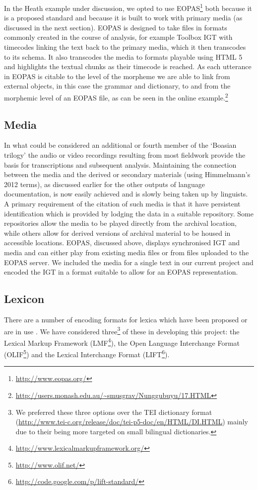 In the Heath example under discussion, we opted to use EOPAS\footnote{ \url{http://www.eopas.org/}} \citep{SchroeterEtAl2006} both because it is a proposed standard and because it is built to work with primary media (as discussed in the next section). EOPAS is designed to take files in formats commonly created in the course of analysis, for example Toolbox IGT with timecodes linking the text back to the primary media, which it then transcodes to its schema. It also transcodes the media to formats playable using HTML 5 and highlights the textual chunks as their timecode is reached. As each utterance in EOPAS is citable to the level of the morpheme we are able to link from external objects, in this case the grammar and dictionary, to and from the morphemic level of an EOPAS file, as can be seen in the online example.\footnote{\url{http://users.monash.edu.au/~smusgrav/Nunggubuyu/17.HTML}}

\subsection{Media}
In what could be considered an additional or fourth member of the `Boasian trilogy' the audio or video recordings resulting from most fieldwork provide the basis for transcriptions and subsequent analysis. Maintaining the connection between the media and the derived or secondary materials (using Himmelmann's 2012 terms), \nocite{Himmelmann2012} as discussed earlier for the other outputs of language documentation, is now easily achieved and is slowly being taken up by linguists. A primary requirement of the citation of such media is that it have persistent identification which is provided by lodging the data in a suitable repository. Some repositories allow the media to be played directly from the archival location, while others allow for derived versions of archival material to be housed in accessible locations. EOPAS, discussed above, displays synchronised IGT and media and can either play from existing media files or from files uploaded to the EOPAS server. We included the media for a single text in our current project and encoded the IGT in a format suitable to allow for an EOPAS representation.

\subsection{Lexicon}\label{thie:sec:3-4}
There are a number of encoding formats for lexica which have been proposed or are in use \citep[for a slightly dated summary, see][]{Maxwell2008}. We have considered three\footnote{We 
 preferred these three options over the TEI dictionary format (\url{http://www.tei-c.org/release/doc/tei-p5-doc/en/HTML/DI.HTML}) mainly due to their being more targeted on small bilingual dictionaries.
} of these in developing this project: the Lexical Markup Framework (LMF\footnote{ \url{http://www.lexicalmarkupframework.org/}}), the Open Language Interchange Format (OLIF\footnote{ \url{http://www.olif.net/}}) and the Lexical Interchange Format (LIFT\footnote{ \url{http://code.google.com/p/lift-standard/}}).

